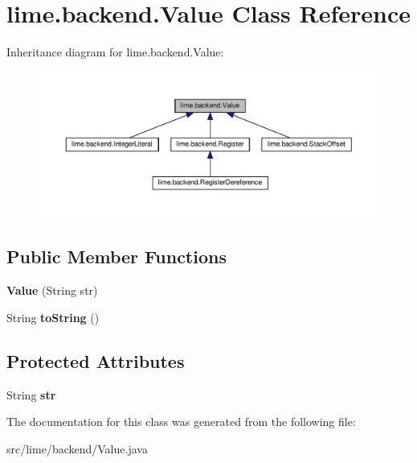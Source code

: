 \hypertarget{classlime_1_1backend_1_1Value}{}\section{lime.\+backend.\+Value Class Reference}
\label{classlime_1_1backend_1_1Value}


Inheritance diagram for lime.\+backend.\+Value\+:
\nopagebreak
\begin{figure}[H]
\begin{center}
\leavevmode
\includegraphics[width=350pt]{classlime_1_1backend_1_1Value__inherit__graph}
\end{center}
\end{figure}
\subsection*{Public Member Functions}
\begin{DoxyCompactItemize}
\item 
\mbox{\label{classlime_1_1backend_1_1Value_abdc67b2df1b78ed6c99b995354660ac4}} 
{\bfseries Value} (String str)
\item 
\mbox{\label{classlime_1_1backend_1_1Value_a34092681f4539f69761215cdfb818aed}} 
String {\bfseries to\+String} ()
\end{DoxyCompactItemize}
\subsection*{Protected Attributes}
\begin{DoxyCompactItemize}
\item 
\mbox{\label{classlime_1_1backend_1_1Value_a992bca7efb93fe40bd5ea29853438c02}} 
String {\bfseries str}
\end{DoxyCompactItemize}


The documentation for this class was generated from the following file\+:\begin{DoxyCompactItemize}
\item 
src/lime/backend/Value.\+java\end{DoxyCompactItemize}
